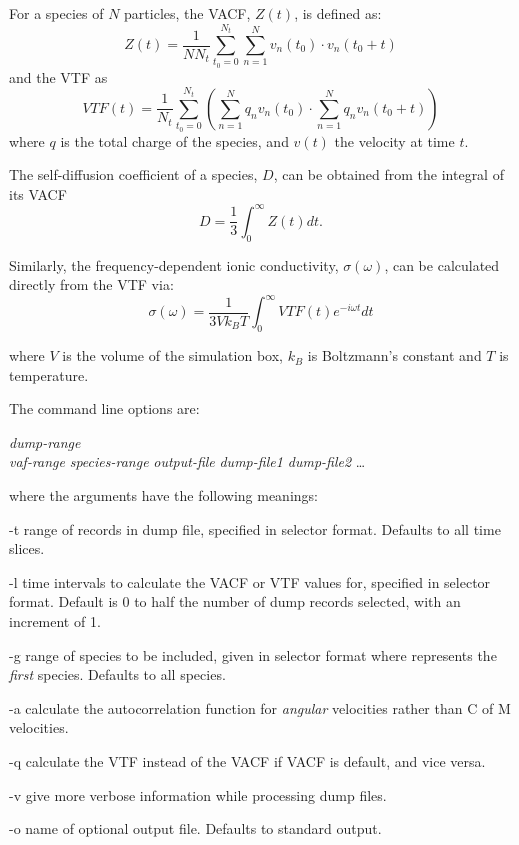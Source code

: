 \documentclass[a4paper,twoside]{report}
\begin{document}
For a species of $N$ particles, the VACF, $Z(t)$, is defined as:
\begin{equation}
  Z(t) = \frac{1}{N N_t} \sum_{t_0=0}^{N_t} \sum_{n=1}^N v_n(t_0) \cdot v_n(t_0 + t)
\end{equation}
and the VTF as
\begin{equation}
  VTF(t)= \frac{1}{N_t} \sum_{t_0=0}^{N_t} \left ( \sum_{n=1}^N q_n v_n(t_0)
  \cdot  \sum_{n=1}^N  q_n v_n(t_0 + t) \right )
\end{equation}
where $q$ is the total charge of the species, and $v(t)$ the
velocity at time $t$.

The self-diffusion coefficient of a species, $D$, can be
obtained from the integral of its VACF
\begin{equation}
  D = \frac{1}{3} \int_0^\infty Z(t) dt .
\end{equation}

Similarly, the frequency-dependent ionic conductivity, $\sigma(\omega)$, can
be calculated directly from the VTF via:
\begin{equation}
  \sigma(\omega) = \frac{1}{3 V k_B T}    \int_0^\infty VTF(t) e^{-i \omega t} dt
\end{equation}

where $V$ is the volume of the simulation box, $k_{B}$ is Boltzmann's
constant and $T$ is temperature.

The command line options are:

\begin{center}
\Lit{[-t} \textit{dump-range}\Lit{]} \\
\Lit{[-l} \textit{vaf-range}\Lit{]}
\Lit{[-g} \textit{species-range}\Lit{]}
\Lit{[-a]}
\Lit{[-q]}
\Lit{[-v]} 
\Lit{[-o} \textit{output-file}\Lit{]}
\textit{dump-file1 dump-file2} \ldots
\end{center}

where the arguments have the following meanings:
\begin{Argdescription}
\item[-t] range of records in dump file, specified in selector format. Defaults to all time slices.
\item[-l] time intervals to calculate the VACF or VTF values for, specified
in selector format. Default is 0 to half the number of dump
records selected, with an increment of 1.
\item[-g] range of species to be included, given in selector format
where  represents the \emph{first} species. Defaults to all species.
\item[-a] calculate the autocorrelation function for \emph{angular} velocities rather than C of M velocities.
\item[-q] calculate the VTF instead of the VACF if VACF is default, and vice versa.
\item[-v] give more verbose information while processing dump files.
\item[-o] name of optional output file. Defaults to standard output.
\end{Argdescription}
\end{document}
